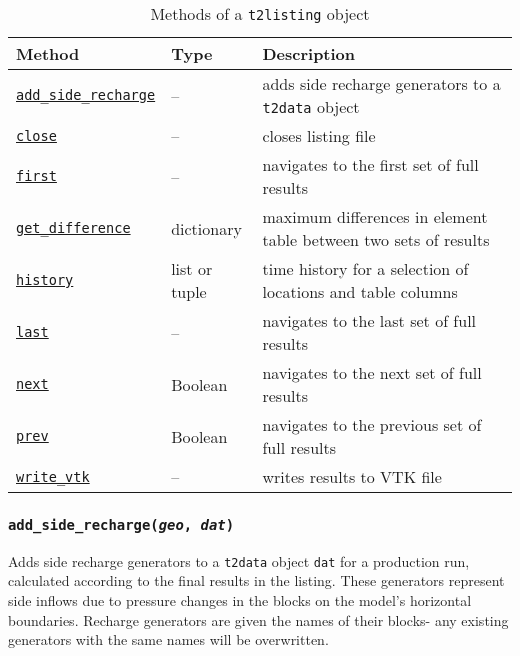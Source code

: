 \begin{table}
  \begin{center}
    \begin{tabular}{|l|l|p{80mm}|}
      \hline
      \textbf{Method} & \textbf{Type} & \textbf{Description}\\
      \hline
      \hyperref[sec:t2listing:add_side_recharge]{\texttt{add\_side\_recharge}} & -- & adds side recharge generators to a \texttt{t2data} object\\
      \hyperref[sec:t2listing:close]{\texttt{close}} & -- & closes listing file\\
      \hyperref[sec:t2listing:first]{\texttt{first}} & -- & navigates to the first set of full results\\
      \hyperref[sec:t2listing:get_difference]{\texttt{get\_difference}} & dictionary & maximum differences in element table between two sets of results\\
      \hyperref[sec:t2listing:history]{\texttt{history}} & list or tuple & time history for a selection of locations and table columns\\
      \hyperref[sec:t2listing:last]{\texttt{last}} & -- & navigates to the last set of full results\\
      \hyperref[sec:t2listing:next]{\texttt{next}} & Boolean & navigates to the next set of full results\\
      \hyperref[sec:t2listing:prev]{\texttt{prev}} & Boolean & navigates to the previous set of full results\\
      \hyperref[sec:t2listing:write_vtk]{\texttt{write\_vtk}} & -- & writes results to VTK file\\
      \hline
    \end{tabular}
    \caption{Methods of a \texttt{t2listing} object}
    \label{tb:t2listing_methods}
  \end{center}
\end{table}

\begin{snugshade}
\subsubsection{\texttt{add\_side\_recharge(\emph{geo}, \emph{dat})}}
\end{snugshade}
\label{sec:t2listing:add_side_recharge}

Adds side recharge generators to a \texttt{t2data} object \texttt{dat} for a production run, calculated according to the final results in the listing.  These generators represent side inflows due to pressure changes in the blocks on the model's horizontal boundaries.  Recharge generators are given the names of their blocks- any existing generators with the same names will be overwritten.

